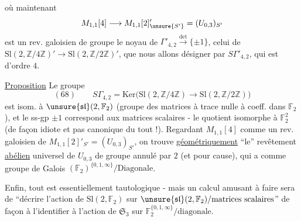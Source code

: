où maintenant
\[
M_{1,1}[4]\longrightarrow M_{1,1}[2]'_{\unsure{S'}}
=(U_{0,3})_{S'}
\]
est un rev. galoisien de groupe le noyau de
$\Gamma'_{4,2}\xrightarrow{\det}\{\pm1\}$,
 celui de
$\mathrm{Sl}(2,\mathbb Z/4\mathbb Z)'
\longrightarrow\mathrm{Sl}(2,\mathbb Z/2\mathbb Z)'$,
que nous allons désigner par $S\Gamma'_{4,2}$, qui est d'ordre $4$.

\uline{Proposition} Le groupe
\[
(68)\qquad
S\Gamma_{4,2}
=
\mathrm{Ker}\bigl(
\mathrm{Sl}(2,\mathbb Z/4\mathbb Z)
\longrightarrow
\mathrm{Sl}(2,\mathbb Z/2\mathbb Z)
\bigr)
\]
est isom. à 
$\unsure{\mathfrak{sl}}(2,\mathbb F_2)$
(groupe des matrices à trace nulle à coeff. dans $\mathbb F_2$),
et le ss-gp $\pm1$ correspond aux matrices scalaires -
le quotient 
isomorphe à  $\mathbb F_2^2$
(de façon idiote et pas canonique du tout !).
Regardant $M_{1,1}[4]$ comme un rev. galoisien de
$M_{1,1}[2]'_{S'}=(U_{0,3})_{S'}$, on trouve
\uline{géométriquement} ``le'' revêtement \uline{abélien} universel de
$U_{0,3}$ de groupe annulé par $2$ (et pour cause), qui a comme groupe
de Galois $(\mathbb F_2)^{\{0,1,\infty\}}/\mathrm{Diagonale}$.

Enfin, tout est essentiellement tautologique - mais un calcul amusant à
faire sera de ``décrire l'action de $\mathrm{Sl}(2,\mathbb F_2)$ sur
$\unsure{\mathfrak{sl}}(2,\mathbb F_2)/\text{matrices scalaires}$''
de façon à l'identifier à l'action de $\mathfrak S_3$ sur
$\mathbb F_2^{\{0,1,\infty\}}/\text{diagonale}$.


